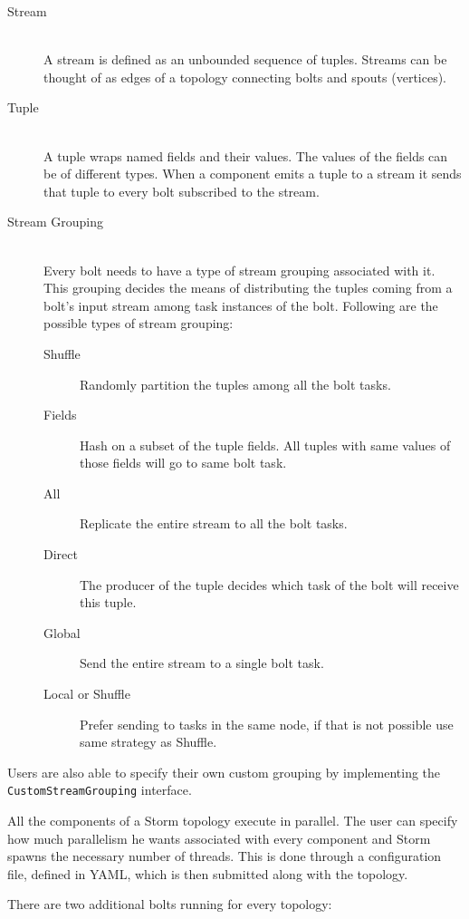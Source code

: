 \documentclass[bsc,deptreport,twoside,singlespacing,normalheadings,parskip]{infthesis}\usepackage[]{graphicx}\usepackage[]{color}
\begin{document}
\begin{description}
  \item[Stream] \hfill \\
  A stream is defined as an unbounded sequence of tuples. Streams can be thought of as edges of a topology connecting bolts and spouts (vertices).
  \item[Tuple] \hfill \\
  A tuple wraps named fields and their values. The values of the fields can be of different types. When a component emits a tuple to a stream it sends that tuple to every bolt subscribed to the stream.
  \item[Stream Grouping] \hfill \\
  Every bolt needs to have a type of stream grouping associated with it. This grouping decides the means of distributing the tuples coming from a bolt's input stream among task instances of the bolt. Following are the possible types of stream grouping:
  \begin{description}
  	\item[Shuffle] Randomly partition the tuples among all the bolt tasks.
  	\item[Fields] Hash on a subset of the tuple fields. All tuples with same values of those fields will go to same bolt task.
  	\item[All] Replicate the entire stream to all the bolt tasks.
  	\item[Direct] The producer of the tuple decides which task of the bolt will receive this tuple.
  	\item[Global] Send the entire stream to a single bolt task.
  	\item[Local or Shuffle] Prefer sending to tasks in the same node, if that is not possible use same strategy as Shuffle.
  \end{description}
\end{description}

Users are also able to specify their own custom grouping by implementing the \texttt{CustomStreamGrouping} interface.

All the components of a Storm topology execute in parallel. The user can specify how much parallelism he wants associated with every component and Storm spawns the necessary number of threads. This is done through a configuration file, defined in YAML, which is then submitted along with the topology.

There are two additional bolts running for every topology:
\end{document}

